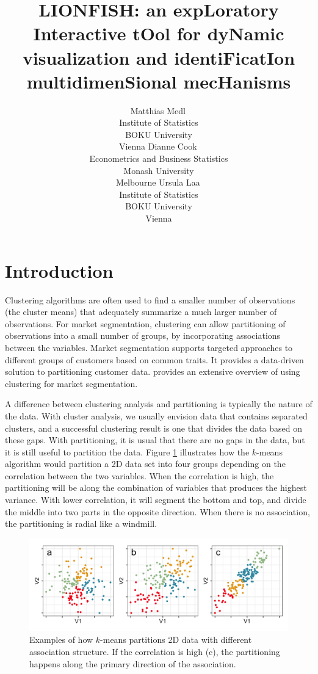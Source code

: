 \documentclass[article]{ajs}
\author{Matthias Medl\,\orcidlink{0000-0002-3354-4579}\\ Institute of Statistics \\ BOKU University \\ Vienna \And 
        Dianne Cook\,\orcidlink{0000-0002-3813-7155}\\ Econometrics and Business Statistics \\ Monash University \\ Melbourne \And
        Ursula Laa\,\orcidlink{0000-0002-0249-6439}\\ Institute of Statistics \\ BOKU University \\ Vienna}
\title{LIONFISH: an expLoratory Interactive tOol for dyNamic visualization and identiFicatIon multidimenSional mecHanisms}
\begin{document}
\section{Introduction}

Clustering algorithms are often used to find a smaller number of observations (the cluster means) that adequately summarize a much larger number of observations. For market segmentation, clustering can allow partitioning of observations into a small number of groups, by incorporating associations between the variables. Market segmentation supports targeted approaches to different groups of customers based on common traits.  It provides a data-driven solution to partitioning customer data. \cite{leisch2018market} provides an extensive overview of using clustering for market segmentation. 

A difference between clustering analysis and partitioning is typically the nature of the data. With cluster analysis, we usually envision data that contains separated clusters, and a successful clustering result is one that divides the data based on these gaps. With partitioning, it is usual that there are no gaps in the data, but it is still useful to partition the data. Figure \ref{kmeans-partition} illustrates how the $k$-means algorithm would partition a 2D data set into four groups depending on the correlation between the two variables.  When the correlation is high, the partitioning will be along the combination of variables that produces the highest variance. With lower correlation, it will segment the bottom and top, and divide the middle into two parts in the opposite direction. When there is no association, the partitioning is radial like a windmill.

\begin{figure}[h]
\centerline{\includegraphics[width=1\textwidth]{images/intro1.png}}
\caption{Examples of how $k$-means partitions 2D data with different association structure. If the correlation is high (c), the partitioning happens along the primary direction of the association.}
\label{kmeans-partition}
\end{figure}
\end{document}
